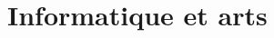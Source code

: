 \subsubsection[]{}
\label{subsub:IV.2.1.1}

\overparagraph{}


\overparagraph{}








\subsubsection[]{}
\label{subsub:IV.2.1.3}


\overparagraph{}


\overparagraph{}



\subsection[]{}
\label{sub:IV.2.2}















\section[Informatique et arts]{Informatique et arts}
\label{sec:IV.3}


\subsection[]{}
\label{sub:IV.3.1}


\subsubsection[]{}
\label{subsub:IV.3.1.1}


\overparagraph{}



\overparagraph{}



